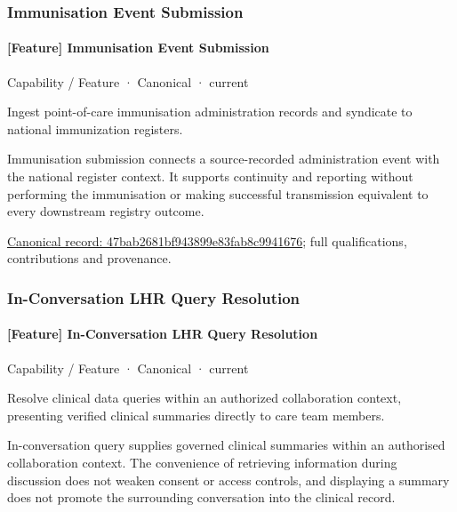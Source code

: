 \subsubsection{Immunisation Event Submission}

\paragraph{[Feature] Immunisation Event Submission}

\label{element:47bab2681bf943899e83fab8c9941676}
{\small Capability / Feature · Canonical · current}\par

Ingest point-of-care immunisation administration records and syndicate to national immunization registers.



Immunisation submission connects a source-recorded administration event with the national register context. It supports continuity and reporting without performing the immunisation or making successful transmission equivalent to every downstream registry outcome.


{\footnotesize \href{../../../../continuum/strategy/capability/feature/47bab2681bf943899e83fab8c9941676.md}{Canonical record: 47bab2681bf943899e83fab8c9941676}; full qualifications, contributions and provenance.}\par
\subsubsection{In-Conversation LHR Query Resolution}

\paragraph{[Feature] In-Conversation LHR Query Resolution}

\label{element:d4437b477aab42c79b5f45150c5d7f3f}
{\small Capability / Feature · Canonical · current}\par

Resolve clinical data queries within an authorized collaboration context, presenting verified clinical summaries directly to care team members.



In-conversation query supplies governed clinical summaries within an authorised collaboration context. The convenience of retrieving information during discussion does not weaken consent or access controls, and displaying a summary does not promote the surrounding conversation into the clinical record.


